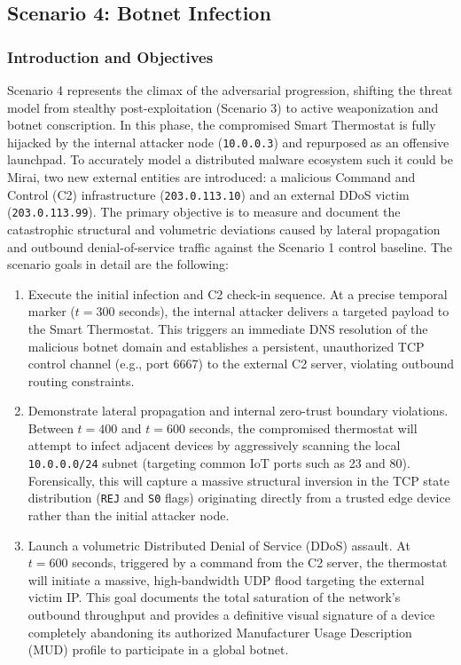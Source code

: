 \subsection{Scenario 4: Botnet Infection}

\subsubsection{Introduction and Objectives}
Scenario 4 represents the climax of the adversarial progression, shifting the threat model from stealthy post-exploitation (Scenario 3) to active weaponization and botnet conscription. In this phase, the compromised Smart Thermostat is fully hijacked by the internal attacker node (\texttt{10.0.0.3}) and repurposed as an offensive launchpad. To accurately model a distributed malware ecosystem such it could be Mirai, two new external entities are introduced: a malicious Command and Control (C2) infrastructure (\texttt{203.0.113.10}) and an external DDoS victim (\texttt{203.0.113.99}). The primary objective is to measure and document the catastrophic structural and volumetric deviations caused by lateral propagation and outbound denial-of-service traffic against the Scenario 1 control baseline. The scenario goals in detail are the following:

\begin{enumerate}
	\item Execute the initial infection and C2 check-in sequence. At a precise temporal marker ($t=300$ seconds), the internal attacker delivers a targeted payload to the Smart Thermostat. This triggers an immediate DNS resolution of the malicious botnet domain and establishes a persistent, unauthorized TCP control channel (e.g., port 6667) to the external C2 server, violating outbound routing constraints.
	\item Demonstrate lateral propagation and internal zero-trust boundary violations. Between $t=400$ and $t=600$ seconds, the compromised thermostat will attempt to infect adjacent devices by aggressively scanning the local \texttt{10.0.0.0/24} subnet (targeting common IoT ports such as 23 and 80). Forensically, this will capture a massive structural inversion in the TCP state distribution (\texttt{REJ} and \texttt{S0} flags) originating directly from a trusted edge device rather than the initial attacker node.
	\item Launch a volumetric Distributed Denial of Service (DDoS) assault. At $t=600$ seconds, triggered by a command from the C2 server, the thermostat will initiate a massive, high-bandwidth UDP flood targeting the external victim IP. This goal documents the total saturation of the network's outbound throughput and provides a definitive visual signature of a device completely abandoning its authorized Manufacturer Usage Description (MUD) profile to participate in a global botnet.
\end{enumerate}


